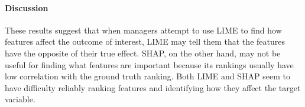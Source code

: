 \documentclass[11pt]{article}    %
\begin{document}
        \paragraph{Discussion}
        These results suggest that when managers attempt to use LIME to find how features affect the outcome of interest, LIME may tell them that the features have the opposite of their true effect. SHAP, on the other hand, may not be useful for finding what features are important because its rankings usually have low correlation with the ground truth ranking. Both LIME and SHAP seem to have difficulty reliably ranking features and identifying how they affect the target variable.


                        

\end{document}
